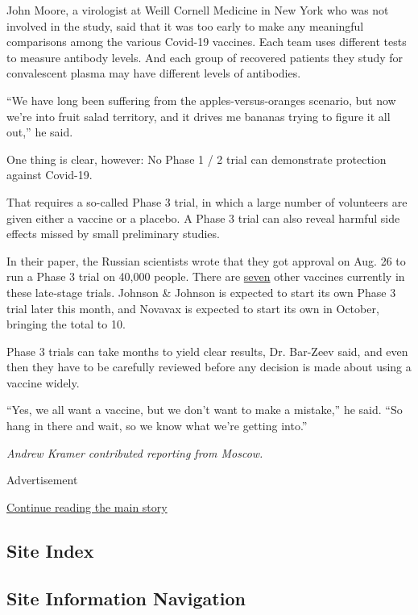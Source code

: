 John Moore, a virologist at Weill Cornell Medicine in New York who was
not involved in the study, said that it was too early to make any
meaningful comparisons among the various Covid-19 vaccines. Each team
uses different tests to measure antibody levels. And each group of
recovered patients they study for convalescent plasma may have different
levels of antibodies.

``We have long been suffering from the apples-versus-oranges scenario,
but now we're into fruit salad territory, and it drives me bananas
trying to figure it all out,'' he said.

One thing is clear, however: No Phase 1 / 2 trial can demonstrate
protection against Covid-19.

That requires a so-called Phase 3 trial, in which a large number of
volunteers are given either a vaccine or a placebo. A Phase 3 trial can
also reveal harmful side effects missed by small preliminary studies.

In their paper, the Russian scientists wrote that they got approval on
Aug. 26 to run a Phase 3 trial on 40,000 people. There are
\href{https://www.nytimes3xbfgragh.onion/interactive/2020/science/coronavirus-vaccine-tracker.html}{seven}
other vaccines currently in these late-stage trials. Johnson \& Johnson
is expected to start its own Phase 3 trial later this month, and Novavax
is expected to start its own in October, bringing the total to 10.

Phase 3 trials can take months to yield clear results, Dr. Bar-Zeev
said, and even then they have to be carefully reviewed before any
decision is made about using a vaccine widely.

``Yes, we all want a vaccine, but we don't want to make a mistake,'' he
said. ``So hang in there and wait, so we know what we're getting into.''

\emph{Andrew Kramer contributed reporting from Moscow.}

Advertisement

\protect\hyperlink{after-bottom}{Continue reading the main story}

\hypertarget{site-index}{%
\subsection{Site Index}\label{site-index}}

\hypertarget{site-information-navigation}{%
\subsection{Site Information
Navigation}\label{site-information-navigation}}

